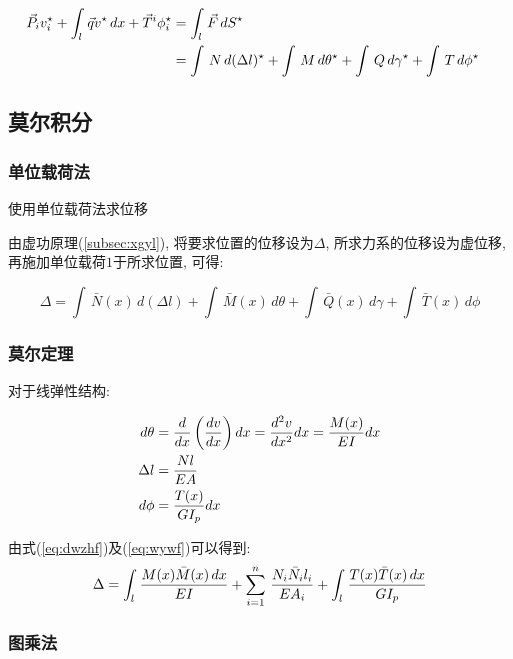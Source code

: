 \begin{align}\label{eq:xgyl}
    {\vec P_i}{v_i^\star} + {\int_l\,{\vec q}v^{\star}\,dx} + {{\vec T^i}{\phi^\star_i}}%
    &= \int_l\,{\vec F}\,d{S^{\star}}\cr
    &= \int\,N\,d(\Delta l)^\star + \int\,M\,d\theta^\star + \int\,Q\,d\gamma^\star + \int\,T\,d\phi^\star
\end{align}

\subsection{莫尔积分}

\subsubsection{单位载荷法}
{\imp 使用单位载荷法求位移}\par
由虚功原理(\ref{subsec:xgyl}), 将要求位置的位移设为$\Delta$, 所求力系的位移设为虚位移,%
再施加单位载荷$1$于所求位置, 可得:

\begin{equation}
    \label{eq:dwzhf}
    \Delta = {\int\,{\bar N}(x)\,d(\Delta l)} + {\int\,{\bar M}(x)\,d\theta} +%
    {\int\,{\bar Q}(x)\,d\gamma} + {\int\,{\bar T}(x)\,d\phi}
\end{equation}

\subsubsection{莫尔定理}

对于{\imp 线弹性结构}:

\begin{subequations}
    \begin{align}\label{eq:wywf}
        d\theta &= {d\over dx}\left({dv\over dx}\right)dx = {d^2v\over dx^2}dx = {M(x)\over EI}dx\\
        \Delta l &= {Nl\over EA}\\
        d\phi &= {T(x)\over GI_p}dx
    \end{align}
\end{subequations}

由式(\ref{eq:dwzhf})及(\ref{eq:wywf})可以得到:
\begin{equation}\label{eq:medl}
    \Delta = \int_l\,{M(x){\bar M}(x)\,dx\over EI} + \sum_{i=1}^n\,{N_i{\bar N}_il_i\over EA_i}%
    + \int_l\,{T(x){\bar T}(x)\,dx\over GI_p}
\end{equation}

\subsubsection{图乘法}

